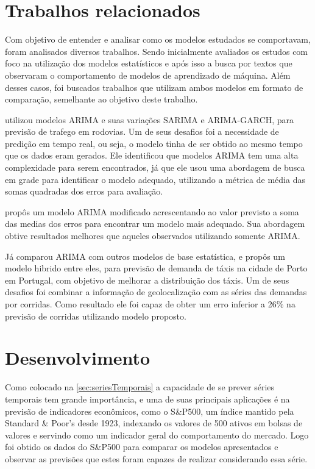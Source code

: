 \documentclass[
    12pt,
    oneside,
    a4paper,
    english,
    brazil
]{abntex2}
\begin{document}
\chapter{Trabalhos relacionados}

Com objetivo de entender e analisar como os modelos estudados se comportavam,
foram analisados diversos trabalhos. Sendo inicialmente avaliados os estudos
com foco na utilização dos modelos estatísticos e após isso a busca por textos
que observaram o comportamento de modelos de aprendizado de máquina. Além
desses casos, foi buscados trabalhos que utilizam ambos modelos em formato de
comparação, semelhante ao objetivo deste trabalho.

   utilizou  modelos   ARIMA  e   suas  variações   SARIMA  e
ARIMA-GARCH, para  previsão de trafego em  rodovias. Um de seus  desafios foi a
necessidade de predição em tempo real, ou seja, o modelo tinha de ser obtido ao
mesmo tempo  que os dados eram  gerados. Ele identificou que  modelos ARIMA tem
uma alta complexidade para serem encontrados,  já que ele usou uma abordagem de
busca em  grade para  identificar o  modelo adequado,  utilizando a  métrica de
média das somas quadradas dos erros para avaliação.

  propôs um  modelo  ARIMA modificado  acrescentando ao  valor
previsto a  soma das medias dos  erros para encontrar um  modelo mais adequado.
Sua  abordagem obtive  resultados  melhores que  aqueles observados  utilizando
somente ARIMA\@.

Já  comparou ARIMA com outros modelos de base estatística, e
propôs  um modelo  hibrido entre  eles, para  previsão de  demanda de  táxis na
cidade de Porto em Portugal, com objetivo de melhorar a distribuição dos táxis.
Um de seus  desafios foi combinar a informação de  geolocalização com as séries
das  demandas por  corridas. Como  resultado  ele foi  capaz de  obter um  erro
inferior a 26\% na previsão de corridas utilizando modelo proposto.

\chapter{Desenvolvimento}\label{chap:desenv}
Como colocado na \autoref{sec:seriesTemporais} a capacidade de se prever séries
temporais tem  grande importância,  e uma  de suas  principais aplicações  é na
previsão  de indicadores  econômicos, como  o S\&P500,  um índice  mantido pela
Standard \& Poor's desde 1923, indexando os  valores de 500 ativos em bolsas de
valores e  servindo como um indicador  geral do comportamento do  mercado. Logo
foi obtido os dados do S\&P500 para comparar os modelos apresentados e observar
as previsões que estes foram capazes de realizar considerando essa série.
\end{document}

